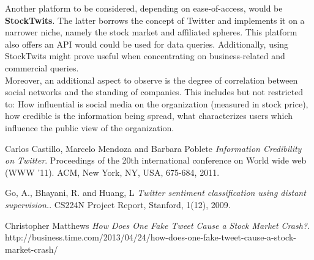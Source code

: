\documentclass[12pt]{article}
\begin{document}
Another platform to be considered, depending on ease-of-access, would be \textbf{StockTwits}. The latter borrows the concept of Twitter and implements it on a narrower niche, namely the stock market and affiliated spheres. This platform also offers an API would could be used for data queries. Additionally, using StockTwits might prove useful when concentrating on business-related and commercial queries.
\\

Moreover, an additional aspect to observe is the degree of correlation between social networks and the standing of companies. This includes but not restricted to: How influential is social media on the organization (measured in stock price), how credible is the information being spread, what characterizes users which influence the public view of the organization.


\medskip
 
\newpage
\begin{thebibliography}{9}

Carlos Castillo, Marcelo Mendoza and Barbara Poblete
\textit{Information Credibility on Twitter}. 
Proceedings of the 20th international conference on World wide web (WWW '11). ACM, New York, NY, USA, 675-684, 2011.
 
Go, A., Bhayani, R. and Huang, L
\textit{Twitter sentiment classification using distant supervision.}.
CS224N Project Report, Stanford, 1(12), 2009.

 Christopher Matthews
\textit{How Does One Fake Tweet Cause a Stock Market Crash?}. 
http://business.time.com/2013/04/24/how-does-one-fake-tweet-cause-a-stock-market-crash/


\end{thebibliography}
\end{document}
